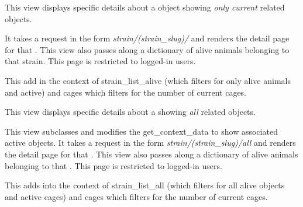 \documentclass[letterpaper,10pt,english]{sphinxmanual}
\begin{document}

\begin{fulllineitems}
\label{animals:mousedb.animal.views.StrainDetail}
This view displays specific details about a {\hyperref[animals:mousedb.animal.models.Strain]{}} object showing \emph{only current} related objects.

It takes a request in the form \emph{strain/(strain\_slug)/} and renders the detail page for that {\hyperref[animals:mousedb.animal.models.Strain]{}}.
This view also passes along a dictionary of alive animals belonging to that strain.
This page is restricted to logged-in users.

\begin{fulllineitems}
\label{animals:mousedb.animal.views.StrainDetail.get_context_data}
This add in the context of strain\_list\_alive (which filters for only alive animals and active) and cages which filters for the number of current cages.

\end{fulllineitems}


\end{fulllineitems}


\begin{fulllineitems}
\label{animals:mousedb.animal.views.StrainDetailAll}
This view displays specific details about a {\hyperref[animals:mousedb.animal.models.Strain]{}} showing \emph{all} related objects.

This view subclasses {\hyperref[animals:mousedb.animal.views.StrainDetail]{}} and modifies the get\_context\_data to show associated active objects.
It takes a request in the form \emph{strain/(strain\_slug)/all} and renders the detail page for that {\hyperref[animals:mousedb.animal.models.Strain]{}}.
This view also passes along a dictionary of alive animals belonging to that {\hyperref[animals:mousedb.animal.models.Strain]{}}.
This page is restricted to logged-in users.

\begin{fulllineitems}
\label{animals:mousedb.animal.views.StrainDetailAll.get_context_data}
This adds into the context of strain\_list\_all (which filters for all alive {\hyperref[animals:mousedb.animal.models.Animal]{}} objects and active cages) and cages which filters for the number of current cages.

\end{fulllineitems}


\end{fulllineitems}
\end{document}
